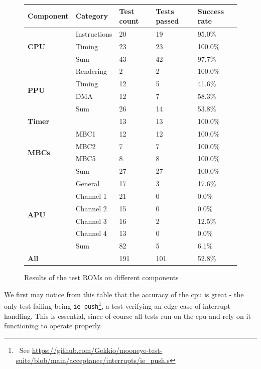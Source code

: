 \documentclass[11pt]{report}
\newcommand{\ftnt}[1]{\footnote{~See \url{#1}}}
\begin{document}
\begin{figure}[h]
    \centering
    \begin{tabular}{|l|l|l|l|l|}
    \hline
    \textbf{Component} & \textbf{Category} & \textbf{Test count} & \textbf{Tests passed} & \textbf{Success rate} \\ \hline
	\multirow{3}{*}{\textbf{CPU}}
    & Instructions & 20 & 19 &  95.0\% \\
    &       Timing & 23 & 23 & 100.0\% \\\cline{2-5}
    &          Sum & 43 & 42 &  97.7\% \\\hline
	\multirow{4}{*}{\textbf{PPU}}
    &    Rendering &  2 &  2 & 100.0\% \\
    &       Timing & 12 &  5 &  41.6\% \\
    &          DMA & 12 &  7 &  58.3\% \\\cline{2-5}
    &          Sum & 26 & 14 &  53.8\% \\\hline
    \multicolumn{2}{|l|}{\textbf{Timer}} & 13 & 13 & 100.0\% \\\hline
   	\multirow{4}{*}{\textbf{MBCs}}
    &         MBC1 & 12 & 12 & 100.0\% \\
    &         MBC2 &  7 &  7 & 100.0\% \\
    &         MBC5 &  8 &  8 & 100.0\% \\\cline{2-5}
    &          Sum & 27 & 27 & 100.0\% \\\hline
   	\multirow{6}{*}{\textbf{APU}}
    &      General & 17 &  3 &  17.6\% \\
    &    Channel 1 & 21 &  0 &   0.0\% \\
    &    Channel 2 & 15 &  0 &   0.0\% \\
    &    Channel 3 & 16 &  2 &  12.5\% \\
    &    Channel 4 & 13 &  0 &   0.0\% \\\cline{2-5}
    &          Sum & 82 &  5 &   6.1\% \\\hline
    \multicolumn{2}{|l|}{\textbf{All}} & 191 & 101 & 52.8\% \\\hline
    \end{tabular}
    \caption{Results of the test ROMs on different components}
    \label{fig:stats-tests-absolute}
\end{figure}

We first may notice from this table that the accuracy of the \gls{cpu} is great - the only test failing being \texttt{ie\_push}\ftnt{https://github.com/Gekkio/mooneye-test-suite/blob/main/acceptance/interrupts/ie\_push.s}, a test verifying an edge-case of interrupt handling. This is essential, since of course all tests run on the \gls{cpu} and rely on it functioning to operate properly.
\end{document}
